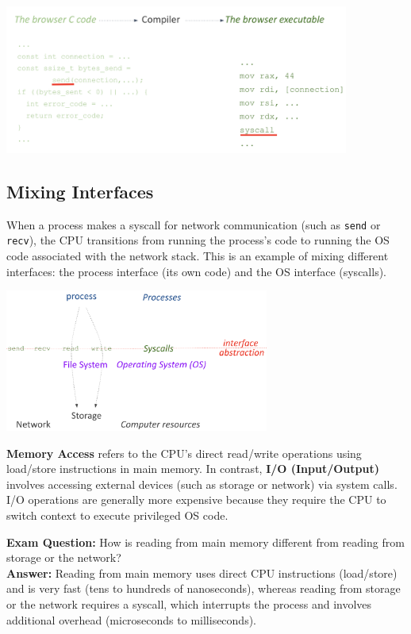 \documentclass[../../compsys.tex]{subfiles}
\begin{document}
\begin{center}
  \includegraphics[width=0.85\textwidth]{chapters/L1/images/syscalls2.png}
\end{center}
\newpage
\subsection{Mixing Interfaces}
When a process makes a syscall for network communication (such as \texttt{send} or \texttt{recv}), the CPU transitions from running the process’s code to running the OS code associated with the network stack. This is an example of mixing different interfaces: the process interface (its own code) and the OS interface (syscalls).
\begin{center}
  \includegraphics[width=0.65\textwidth]{chapters/L1/images/mix_int.png}
\end{center}
\vfill
\begin{definition}
\textbf{Memory Access} refers to the CPU’s direct read/write operations using load/store instructions in main memory. In contrast, \textbf{I/O (Input/Output)} involves accessing external devices (such as storage or network) via system calls. I/O operations are generally more expensive because they require the CPU to switch context to execute privileged OS code.
\end{definition}
\vspace{0.5em}
\textbf{Exam Question:} How is reading from main memory different from reading from storage or the network? \\[0.5em]
\textbf{Answer:} Reading from main memory uses direct CPU instructions (load/store) and is very fast (tens to hundreds of nanoseconds), whereas reading from storage or the network requires a syscall, which interrupts the process and involves additional overhead (microseconds to milliseconds).
\end{document}
